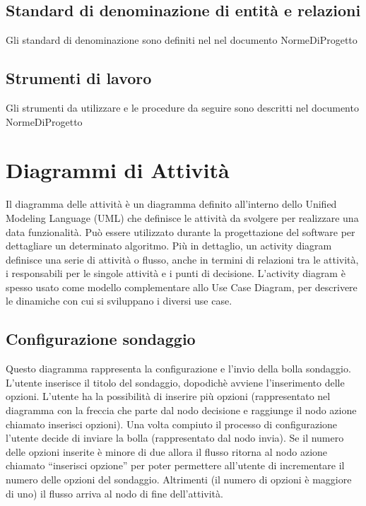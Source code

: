 \subsection{Standard di denominazione di entità e relazioni }
Gli standard di denominazione sono definiti nel nel
documento NormeDiProgetto

\subsection{Strumenti di lavoro}
Gli strumenti da utilizzare e le procedure da seguire sono descritti
nel documento NormeDiProgetto


\section{Diagrammi di Attività}
Il diagramma delle attività è un diagramma definito all'interno dello
Unified Modeling Language (UML) che definisce le attività da svolgere
per realizzare una data funzionalità. Può essere utilizzato durante la
progettazione del software per dettagliare un determinato
algoritmo. Più in dettaglio, un activity diagram definisce una serie
di attività o flusso, anche in termini di relazioni tra le attività, i
responsabili per le singole attività e i punti di
decisione. L'activity diagram è spesso usato come modello
complementare allo Use Case Diagram, per descrivere le dinamiche con
cui si sviluppano i diversi use case. 

\subsection{Configurazione sondaggio}
Questo diagramma rappresenta la configurazione e l'invio della bolla
sondaggio. L’utente inserisce il titolo del sondaggio, dopodichè
avviene l’inserimento delle opzioni. L’utente ha la possibilità di
inserire più opzioni (rappresentato nel diagramma con la freccia che
parte dal nodo decisione e raggiunge il nodo azione chiamato inserisci
opzioni). Una volta compiuto il processo di configurazione l’utente
decide di inviare la bolla (rappresentato dal nodo invia). Se il
numero delle opzioni inserite è minore di due allora il flusso ritorna
al nodo azione chiamato “inserisci opzione” per poter permettere
all’utente di incrementare il numero delle opzioni del
sondaggio. Altrimenti (il numero di opzioni è maggiore di uno) il
flusso arriva al nodo di fine dell’attività. 

